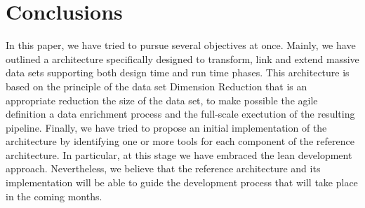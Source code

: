 \section{Conclusions}\label{sec:conclusions}
In this paper, we have tried to pursue several objectives at once. Mainly, we have outlined a architecture specifically designed to transform, link and extend massive data sets supporting both design time and run time phases. 
This architecture is based on the principle of the data set Dimension Reduction that is an appropriate reduction the size of the data set, to make possible the agile definition a data enrichment process and the full-scale exectution of the resulting pipeline. 
Finally, we have tried to propose an initial implementation of the architecture by identifying one or more tools for each component of the reference architecture. In particular, at this stage we have embraced the lean development approach. Nevertheless, we believe that the reference architecture and its implementation will be able to guide the development process that will take place in the coming months.
